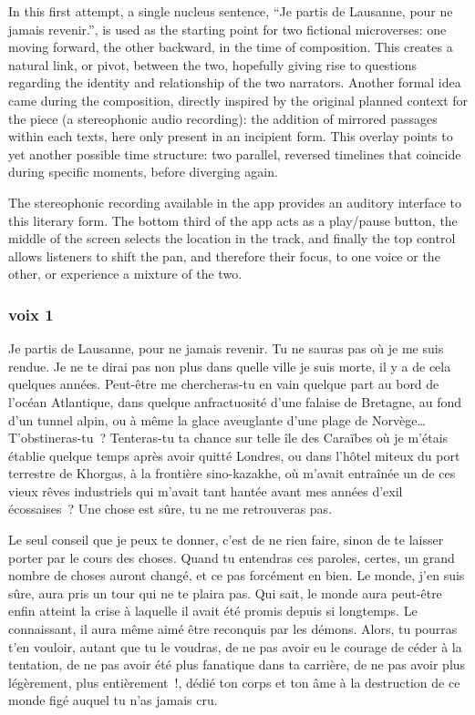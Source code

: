 \documentclass[
  extrafontsizes,
  oneside,
  14pt
]{memoir}
\begin{document}
In this first attempt, a single nucleus sentence, ``Je partis de Lausanne, pour
ne jamais revenir.'', is used as the starting point for two fictional
microverses: one moving forward, the other backward, in the time of
composition. This creates a natural link, or pivot, between the two, hopefully
giving rise to questions regarding the identity and relationship of the two
narrators. Another formal idea came during the composition, directly inspired
by the original planned context for the piece (a stereophonic audio recording):
the addition of mirrored passages within each texts, here only present in an
incipient form. This overlay points to yet another possible time structure: two
parallel, reversed timelines that coincide during specific moments, before
diverging again.

The stereophonic recording available in the app provides an auditory interface
to this literary form. The bottom third of the app acts as a play/pause button,
the middle of the screen selects the location in the track, and finally the top
control allows listeners to shift the pan, and therefore their focus, to one
voice or the other, or experience a mixture of the two.
\\

\newpage

\subsubsection{voix 1}\label{voix-1}

Je partis de Lausanne, pour ne jamais revenir. Tu ne sauras pas où je me suis
rendue. Je ne te dirai pas non plus dans quelle ville je suis morte, il y a de
cela quelques années. Peut-être me chercheras-tu en vain quelque part au bord
de l'océan Atlantique, dans quelque anfractuosité d'une falaise de Bretagne, au
fond d'un tunnel alpin, ou à même la glace aveuglante d'une plage de
Norvège\ldots{} T'obstineras-tu~? Tenteras-tu ta chance sur telle île des
Caraïbes où je m'étais établie quelque temps après avoir quitté Londres, ou
dans l'hôtel miteux du port terrestre de Khorgas, à la frontière sino-kazakhe,
où m'avait entraînée un de ces vieux rêves industriels qui m'avait tant hantée
avant mes années d'exil écossaises~? Une chose est sûre, tu ne me retrouveras
pas.

Le seul conseil que je peux te donner, c'est de ne rien faire, sinon de te
laisser porter par le cours des choses. Quand tu entendras ces paroles, certes,
un grand nombre de choses auront changé, et ce pas forcément en bien. Le monde,
j'en suis sûre, aura pris un tour qui ne te plaira pas. Qui sait, le monde aura
peut-être enfin atteint la crise à laquelle il avait été promis depuis si
longtemps. Le connaissant, il aura même aimé être reconquis par les démons.
Alors, tu pourras t'en vouloir, autant que tu le voudras, de ne pas avoir eu le
courage de céder à la tentation, de ne pas avoir été plus fanatique dans ta
carrière, de ne pas avoir plus légèrement, plus entièrement~!, dédié ton corps
et ton âme à la destruction de ce monde figé auquel tu n'as jamais cru.
\end{document}
